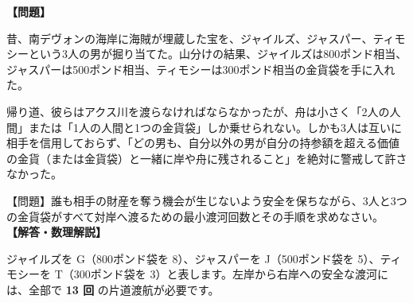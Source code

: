 \documentclass[10pt,a4paper,oneside,openany]{ltjsbook}
\begin{document}
\begin{tcolorbox}[colback=softblue,colframe=primaryblue,title=\textbf{第 374 問：アクス川の渡河パズル（宝物を運ぶ三人の男） （原題: CROSSING THE RIVER AXE.）},arc=2mm,boxrule=1pt,breakable]
\textbf{【問題】}\par\vspace{0.3em}
昔、南デヴォンの海岸に海賊が埋蔵した宝を、ジャイルズ、ジャスパー、ティモシーという3人の男が掘り当てた。山分けの結果、ジャイルズは800ポンド相当、ジャスパーは500ポンド相当、ティモシーは300ポンド相当の金貨袋を手に入れた。

帰り道、彼らはアクス川を渡らなければならなかったが、舟は小さく「2人の人間」または「1人の人間と1つの金貨袋」しか乗せられない。しかも3人は互いに相手を信用しておらず、「どの男も、自分以外の男が自分の持参額を超える価値の金貨（または金貨袋）と一緒に岸や舟に残されること」を絶対に警戒して許さなかった。

【問題】誰も相手の財産を奪う機会が生じないよう安全を保ちながら、3人と3つの金貨袋がすべて対岸へ渡るための最小渡河回数とその手順を求めなさい。
\tcblower
\textbf{【解答・数理解説】}\par\vspace{0.3em}
ジャイルズを G（800ポンド袋を 8）、ジャスパーを J（500ポンド袋を 5）、ティモシーを T（300ポンド袋を 3）と表します。左岸から右岸への安全な渡河には、全部で \textbf{13 回} の片道渡航が必要です。


\end{tcolorbox}
\end{document}
